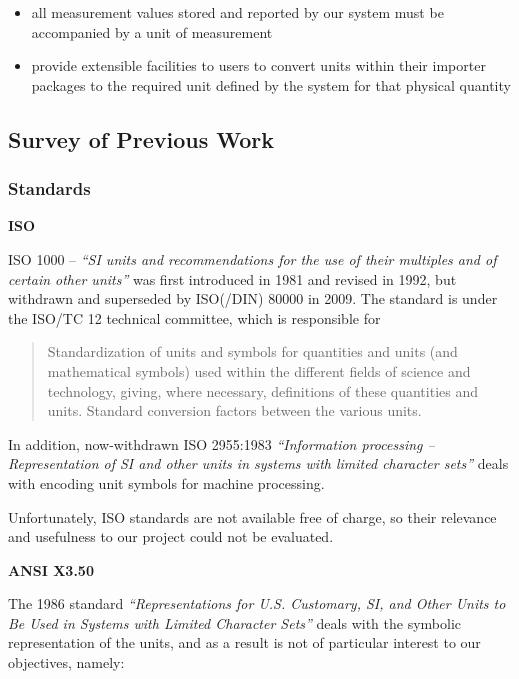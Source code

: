 \begin{itemize}
\tightlist
\item
  all measurement values stored and reported by our system must be
  accompanied by a unit of measurement
\item
  provide extensible facilities to users to convert units within their
  importer packages to the required unit defined by the system for that
  physical quantity
\end{itemize}

\subsection{Survey of Previous Work}\label{survey-of-previous-work}

\subsubsection{Standards}\label{standards}

\textbf{ISO}

ISO 1000 -- \emph{``SI units and recommendations for the use of their
multiples and of certain other units''} was first introduced in 1981 and
revised in 1992, but withdrawn and superseded by ISO(/DIN) 80000 in
2009. The standard is under the ISO/TC 12 technical committee, which is
responsible for

\begin{quote}
Standardization of units and symbols for quantities and units (and
mathematical symbols) used within the different fields of science and
technology, giving, where necessary, definitions of these quantities and
units. Standard conversion factors between the various units.
\end{quote}

In addition, now-withdrawn ISO 2955:1983 \emph{``Information processing
-- Representation of SI and other units in systems with limited
character sets''} deals with encoding unit symbols for machine
processing.

Unfortunately, ISO standards are not available free of charge, so their
relevance and usefulness to our project could not be evaluated.

\textbf{ANSI X3.50}

The 1986 standard \emph{``Representations for U.S. Customary, SI, and
Other Units to Be Used in Systems with Limited Character Sets''} deals
with the symbolic representation of the units, and as a result is not of
particular interest to our objectives, namely:

